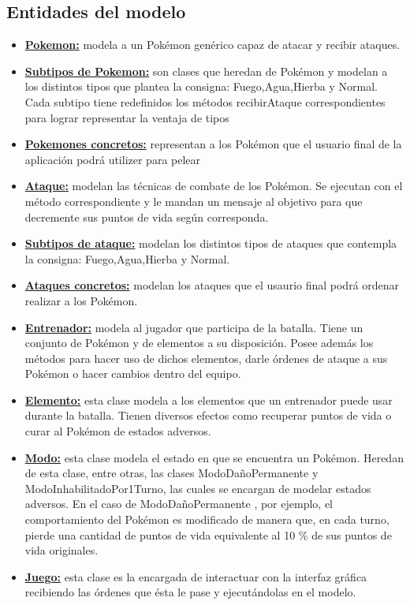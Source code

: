 \subsection{Entidades del modelo}
  \begin{itemize}
    \item \underline{\textbf{Pokemon:}} modela a un Pokémon genérico capaz de atacar y recibir ataques.
    \item \underline{\textbf{Subtipos de Pokemon:}} son clases que heredan de Pokémon y modelan a los
    distintos tipos que plantea la consigna: Fuego,Agua,Hierba y Normal. Cada subtipo tiene redefinidos
    los métodos recibirAtaque correspondientes para lograr representar la ventaja de tipos
    \item \underline{\textbf{Pokemones concretos:}} representan a los Pokémon que el usuario final de la
    aplicación podrá utilizer para pelear
    \item \underline{\textbf{Ataque:}} modelan las técnicas de combate de los Pokémon. Se ejecutan con el
    método correspondiente y le mandan un mensaje al objetivo para que decremente sus puntos de vida según
    corresponda.
    \item \underline{\textbf{Subtipos de ataque:}} modelan los distintos tipos de ataques que contempla la
    consigna: Fuego,Agua,Hierba y Normal.
    \item \underline{\textbf{Ataques concretos:}} modelan los ataques que el usaurio final podrá ordenar
    realizar a los Pokémon.
    \item \underline{\textbf{Entrenador:}} modela al jugador que participa de la batalla. Tiene un conjunto
    de Pokémon y de elementos a su disposición. Posee además los métodos para hacer uso de dichos elementos,
    darle órdenes de ataque a sus Pokémon o hacer cambios dentro del equipo.
    \item \underline{\textbf{Elemento:}} esta clase modela a los elementos que un entrenador puede usar
    durante la batalla. Tienen diversos efectos como recuperar puntos de vida o curar al Pokémon de
    estados adversos.
    \item \underline{\textbf{Modo:}} esta clase modela el estado en que se encuentra un Pokémon. Heredan
    de esta clase, entre otras, las clases ModoDañoPermanente y ModoInhabilitadoPor1Turno, las cuales se
    encargan de modelar estados adversos. En el caso de ModoDañoPermanente , por ejemplo, el comportamiento
    del Pokémon es modificado de manera que, en cada turno, pierde una cantidad de puntos de vida equivalente
    al 10 \% de sus puntos de vida originales.
    \item \underline{\textbf{Juego:}} esta clase es la encargada de interactuar con la interfaz gráfica
    recibiendo las órdenes que ésta le pase y ejecutándolas en el modelo.
  \end{itemize}